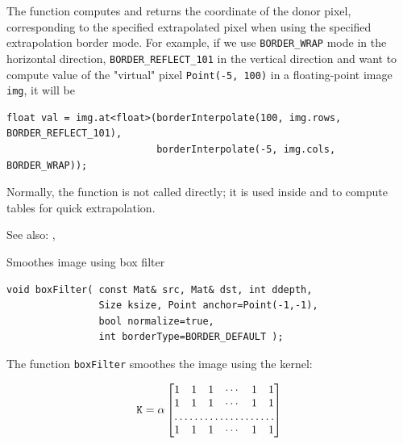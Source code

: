 The function computes and returns the coordinate of the donor pixel, corresponding to the specified extrapolated pixel when using the specified extrapolation border mode. For example, if we use \texttt{BORDER\_WRAP} mode in the horizontal direction, \texttt{BORDER\_REFLECT\_101} in the vertical direction and want to compute value of the "virtual" pixel \texttt{Point(-5, 100)} in a floating-point image \texttt{img}, it will be

\begin{lstlisting}
float val = img.at<float>(borderInterpolate(100, img.rows, BORDER_REFLECT_101),
                          borderInterpolate(-5, img.cols, BORDER_WRAP));
\end{lstlisting}

Normally, the function is not called directly; it is used inside  and  to compute tables for quick extrapolation.

See also: , 

\label{boxFilter}
Smoothes image using box filter

\begin{lstlisting}
void boxFilter( const Mat& src, Mat& dst, int ddepth,
                Size ksize, Point anchor=Point(-1,-1),
                bool normalize=true,
                int borderType=BORDER_DEFAULT );
\end{lstlisting}
\begin{description}
\end{description}

The function \texttt{boxFilter} smoothes the image using the kernel:

\[ \texttt{K} = \alpha
\begin{bmatrix}
1 & 1 & 1 & \cdots & 1 & 1 \\
1 & 1 & 1 & \cdots & 1 & 1 \\
\hdotsfor{6} \\
1 & 1 & 1 & \cdots & 1 & 1
\end{bmatrix}
\]

